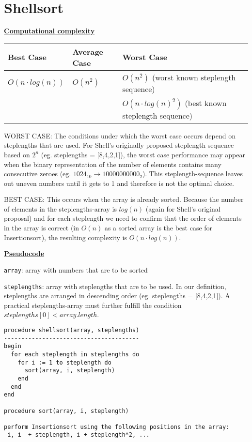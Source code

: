 \documentclass[a4paper]{report}
\begin{document}
\chapter*{Shellsort}

\underline{\bf{Computational complexity}}

\begin{tabular}{|l|l| l |}
\hline
Best Case    & Average Case  &  Worst Case\\ \hline
$O(n\cdot log(n))$ & $O(n^2)$  &  $O(n^2)$ (worst known steplength sequence) \\
& & $O(n\cdot log(n)^2)$ (best known steplength sequence) \\ \hline
\end{tabular}

WORST CASE: The conditions under which the worst case occurs depend on steplengths that are used. For Shell's originally proposed steplength sequence based on $2^n$ (eg. steplengths = [8,4,2,1]), the worst case performance may appear when the binary representation of the number of elements contains many consecutive zeroes (eg. $1024_{10} \rightarrow 10000000000_2$). This steplength-sequence leaves out uneven numbers until it gets to 1 and therefore is not the optimal choice.

BEST CASE: This occurs when the array is already sorted. Because the number of elements in the steplengths-array is $log(n)$ (again for Shell's original proposal) and for each steplength we need to confirm that the order of elements in the array is correct (in $O(n)$ as a sorted array is the best case for Insertionsort), the resulting complexity is $O(n \cdot log(n))$.


\underline{\bf{Pseudocode}}

\texttt{array}: array with numbers that are to be sorted

\texttt{steplengths}: array with steplengths that are to be used. In our definition, steplengths are arranged in descending order (eg. steplengths = [8,4,2,1]). A practical steplengths-array must further fulfill the condition $steplengths[0] < array.length$. 


\begin{lstlisting}
procedure shellsort(array, steplengths)
---------------------------------------
begin
  for each steplength in steplengths do
    for i := 1 to steplength do
  	  sort(array, i, steplength)   
    end
  end
end

procedure sort(array, i, steplength)
------------------------------------
perform Insertionsort using the following positions in the array:
 i, i  + steplength, i + steplength*2, ...

\end{lstlisting}
\end{document}
